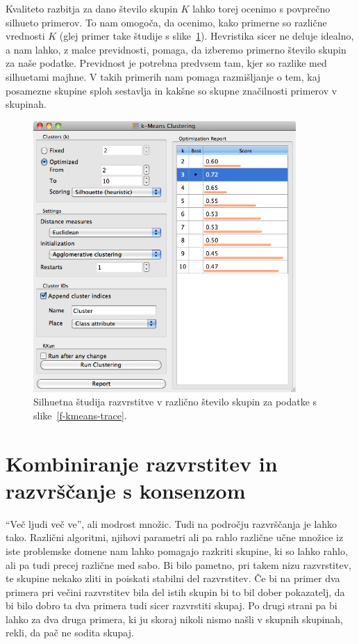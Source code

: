 Kvaliteto razbitja za dano število skupin $K$ lahko torej ocenimo s
povprečno silhueto primerov. To nam omogoča, da ocenimo, kako primerne
so različne vrednosti $K$ (glej primer take študije s
slike~\ref{f-kmeans-silhouette-study}). Hevristika sicer ne deluje
idealno, a nam lahko, z malce previdnosti, pomaga, da izberemo
primerno število skupin za naše podatke. Previdnost je potrebna
predvsem tam, kjer so razlike med silhuetami majhne. V takih primerih
nam pomaga razmišljanje o tem, kaj posamezne skupine sploh sestavlja
in kakšne so skupne značilnosti primerov v skupinah.

\begin{figure}[htbp]
\begin{center}
\includegraphics[width=10cm]{slike/kmeans-silhouette-study.png}
\caption{Silhuetna študija razvrstitve v različno število skupin za
  podatke s slike~\ref{f-kmeans-trace}.}
\label{f-kmeans-silhouette-study}
\end{center}
\end{figure}

\section{Kombiniranje razvrstitev in razvrščanje s konsenzom}

``Več ljudi več ve'', ali modrost množic. Tudi na področju razvrščanja
je lahko tako. Različni algoritmi, njihovi parametri ali pa rahlo
različne učne množice iz iste problemske domene nam lahko pomagajo
razkriti skupine, ki so lahko rahlo, ali pa tudi precej različne med
sabo. Bi bilo pametno, pri takem nizu razvrstitev, te skupine nekako
zliti in poiskati stabilni del razvrstitev. Če bi na primer dva
primera pri večini razvrstitev bila del istih skupin bi to bil dober
pokazatelj, da bi bilo dobro ta dva primera tudi sicer razvrstiti
skupaj. Po drugi strani pa bi lahko za dva druga primera, ki ju skoraj
nikoli nismo našli v skupnih skupinah, rekli, da pač ne sodita skupaj.

